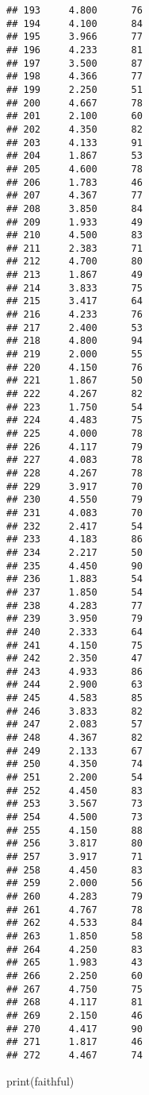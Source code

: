 \documentclass[
]{book}
\newenvironment{Shaded}{\begin{snugshade}}{\end{snugshade}}
\newcommand{\FunctionTok}[1]{\textcolor[rgb]{0.00,0.00,0.00}{#1}}
\newcommand{\NormalTok}[1]{#1}
\begin{document}
\begin{verbatim}
## 193     4.800      76
## 194     4.100      84
## 195     3.966      77
## 196     4.233      81
## 197     3.500      87
## 198     4.366      77
## 199     2.250      51
## 200     4.667      78
## 201     2.100      60
## 202     4.350      82
## 203     4.133      91
## 204     1.867      53
## 205     4.600      78
## 206     1.783      46
## 207     4.367      77
## 208     3.850      84
## 209     1.933      49
## 210     4.500      83
## 211     2.383      71
## 212     4.700      80
## 213     1.867      49
## 214     3.833      75
## 215     3.417      64
## 216     4.233      76
## 217     2.400      53
## 218     4.800      94
## 219     2.000      55
## 220     4.150      76
## 221     1.867      50
## 222     4.267      82
## 223     1.750      54
## 224     4.483      75
## 225     4.000      78
## 226     4.117      79
## 227     4.083      78
## 228     4.267      78
## 229     3.917      70
## 230     4.550      79
## 231     4.083      70
## 232     2.417      54
## 233     4.183      86
## 234     2.217      50
## 235     4.450      90
## 236     1.883      54
## 237     1.850      54
## 238     4.283      77
## 239     3.950      79
## 240     2.333      64
## 241     4.150      75
## 242     2.350      47
## 243     4.933      86
## 244     2.900      63
## 245     4.583      85
## 246     3.833      82
## 247     2.083      57
## 248     4.367      82
## 249     2.133      67
## 250     4.350      74
## 251     2.200      54
## 252     4.450      83
## 253     3.567      73
## 254     4.500      73
## 255     4.150      88
## 256     3.817      80
## 257     3.917      71
## 258     4.450      83
## 259     2.000      56
## 260     4.283      79
## 261     4.767      78
## 262     4.533      84
## 263     1.850      58
## 264     4.250      83
## 265     1.983      43
## 266     2.250      60
## 267     4.750      75
## 268     4.117      81
## 269     2.150      46
## 270     4.417      90
## 271     1.817      46
## 272     4.467      74
\end{verbatim}

\begin{Shaded}
\begin{Highlighting}[]
\FunctionTok{print}\NormalTok{(faithful)}
\end{Highlighting}
\end{Shaded}
\end{document}
